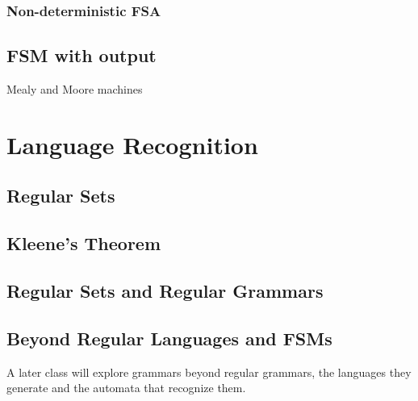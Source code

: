 \documentclass[11pt]{book} %
\theoremstyle {definition}
\theoremstyle {remark}
\begin{document}
        \subsubsection {Non-deterministic FSA}
        
    \subsection {FSM with output}
    Mealy and Moore machines
    
\section {Language Recognition}
    \subsection {Regular Sets}
    \subsection {Kleene's Theorem}
    \subsection {Regular Sets and Regular Grammars}
    \subsection {Beyond Regular Languages and FSMs}
A later class will explore grammars beyond regular grammars, the languages they generate and the automata that recognize them.




\newpage


  
\end{document}
